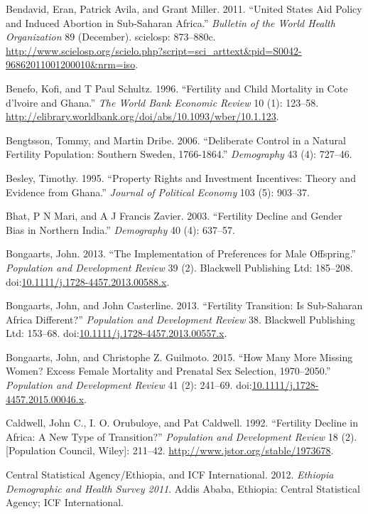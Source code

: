 \documentclass[]{article}
\begin{document}
Bendavid, Eran, Patrick Avila, and Grant Miller. 2011. ``United States Aid Policy and Induced Abortion in Sub-Saharan Africa.'' \emph{Bulletin of the World Health Organization} 89 (December). scielosp: 873--880c. \url{http://www.scielosp.org/scielo.php?script=sci_arttext\&pid=S0042-96862011001200010\&nrm=iso}.

Benefo, Kofi, and T Paul Schultz. 1996. ``Fertility and Child Mortality in Cote d'lvoire and Ghana.'' \emph{The World Bank Economic Review} 10 (1): 123--58. \url{http://elibrary.worldbank.org/doi/abs/10.1093/wber/10.1.123}.

Bengtsson, Tommy, and Martin Dribe. 2006. ``Deliberate Control in a Natural Fertility Population: Southern Sweden, 1766-1864.'' \emph{Demography} 43 (4): 727--46.

Besley, Timothy. 1995. ``Property Rights and Investment Incentives: Theory and Evidence from Ghana.'' \emph{Journal of Political Economy} 103 (5): 903--37.

Bhat, P N Mari, and A J Francis Zavier. 2003. ``Fertility Decline and Gender Bias in Northern India.'' \emph{Demography} 40 (4): 637--57.

Bongaarts, John. 2013. ``The Implementation of Preferences for Male Offspring.'' \emph{Population and Development Review} 39 (2). Blackwell Publishing Ltd: 185--208. doi:\href{https://doi.org/10.1111/j.1728-4457.2013.00588.x}{10.1111/j.1728-4457.2013.00588.x}.

Bongaarts, John, and John Casterline. 2013. ``Fertility Transition: Is Sub-Saharan Africa Different?'' \emph{Population and Development Review} 38. Blackwell Publishing Ltd: 153--68. doi:\href{https://doi.org/10.1111/j.1728-4457.2013.00557.x}{10.1111/j.1728-4457.2013.00557.x}.

Bongaarts, John, and Christophe Z. Guilmoto. 2015. ``How Many More Missing Women? Excess Female Mortality and Prenatal Sex Selection, 1970--2050.'' \emph{Population and Development Review} 41 (2): 241--69. doi:\href{https://doi.org/10.1111/j.1728-4457.2015.00046.x}{10.1111/j.1728-4457.2015.00046.x}.

Caldwell, John C., I. O. Orubuloye, and Pat Caldwell. 1992. ``Fertility Decline in Africa: A New Type of Transition?'' \emph{Population and Development Review} 18 (2). {[}Population Council, Wiley{]}: 211--42. \url{http://www.jstor.org/stable/1973678}.

Central Statistical Agency/Ethiopia, and ICF International. 2012. \emph{Ethiopia Demographic and Health Survey 2011}. Addis Ababa, Ethiopia: Central Statistical Agency; ICF International.
\end{document}

